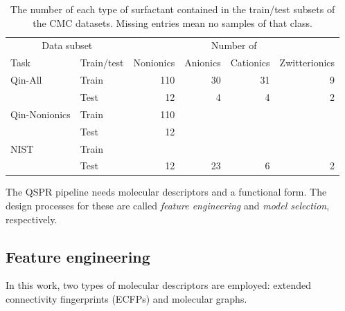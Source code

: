 \begin{table}
    \centering
    \caption{The number of each type of surfactant contained in the train/test subsets of the CMC datasets. Missing entries mean no samples of that class.}
    \label{tab:data-split}
    \begin{tabular}{@{}llrrrr@{}} \toprule \multicolumn{2}{c}{Data subset} & \multicolumn{4}{c}{Number of}                                                    \\\cmidrule(r){1-2}\cmidrule(l){3-6}
               Task                                                    & Train/test                    & Nonionics & Anionics & Cationics & Zwitterionics \\\midrule
               Qin-All                                                 & Train                         & 110       & 30       & 31        & 9             \\
                                                                       & Test                          & 12        & 4        & 4         & 2             \\
               Qin-Nonionics                                           & Train                         & 110       &          &           &               \\
                                                                       & Test                          & 12        &          &           &               \\
               NIST                                                    & Train                         &           &          &           &               \\
                                                                       & Test                          & 12        & 23       & 6         & 2             \\\bottomrule
    \end{tabular}
\end{table}

The QSPR pipeline needs molecular descriptors and a functional form. The design
processes for these are called \emph{feature engineering} and \emph{model
selection}, respectively.

\subsection{Feature engineering}

In this work, two types of molecular descriptors are employed: extended
connectivity fingerprints (ECFPs)
\cite{rogersExtendedConnectivityFingerprints2010} and molecular graphs.

